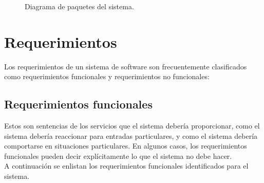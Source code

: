 \begin{figure}[htbp!]
	\begin{center}
		\caption{Diagrama de paquetes del sistema.}
		\label{fig:paquetes}
	\end{center}
\end{figure}


\section{Requerimientos}

Los requerimientos de un sistema de software son frecuentemente clasificados como requerimientos funcionales y requerimientos no funcionales: 

\subsection{Requerimientos funcionales}

Estos son sentencias de los servicios que el sistema debería proporcionar, como el sistema debería reaccionar para entradas particulares, y como el sistema debería comportarse en situaciones particulares. En algunos casos, los requerimientos funcionales pueden decir explícitamente lo que el sistema no debe hacer. \\

A continuación se enlistan los requerimientos funcionales identificados para el sistema.	

